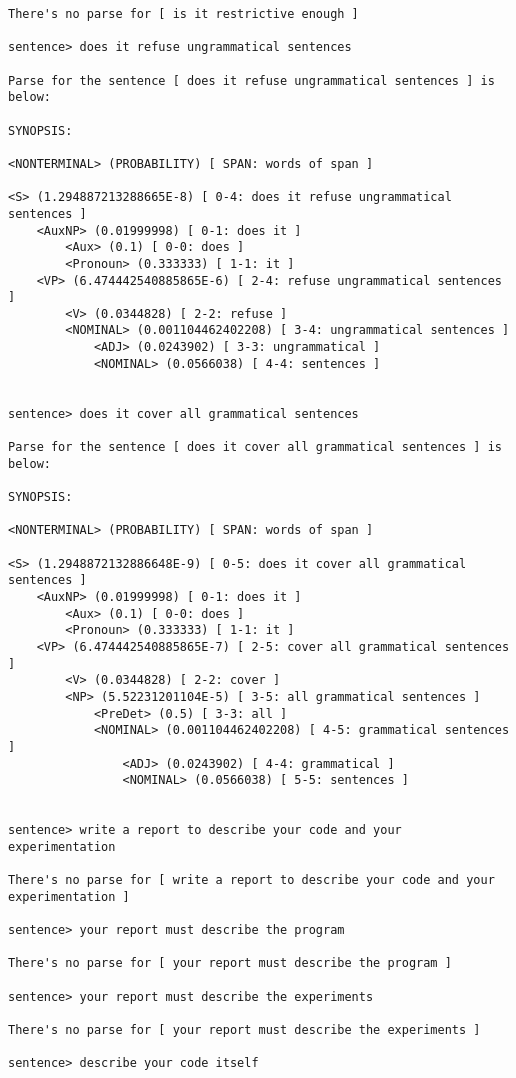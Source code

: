 \begin{verbatim}
There's no parse for [ is it restrictive enough ]

sentence> does it refuse ungrammatical sentences

Parse for the sentence [ does it refuse ungrammatical sentences ] is below:

SYNOPSIS:

<NONTERMINAL> (PROBABILITY) [ SPAN: words of span ]

<S> (1.294887213288665E-8) [ 0-4: does it refuse ungrammatical sentences ]
    <AuxNP> (0.01999998) [ 0-1: does it ]
        <Aux> (0.1) [ 0-0: does ]
        <Pronoun> (0.333333) [ 1-1: it ]
    <VP> (6.474442540885865E-6) [ 2-4: refuse ungrammatical sentences ]
        <V> (0.0344828) [ 2-2: refuse ]
        <NOMINAL> (0.001104462402208) [ 3-4: ungrammatical sentences ]
            <ADJ> (0.0243902) [ 3-3: ungrammatical ]
            <NOMINAL> (0.0566038) [ 4-4: sentences ]


sentence> does it cover all grammatical sentences

Parse for the sentence [ does it cover all grammatical sentences ] is below:

SYNOPSIS:

<NONTERMINAL> (PROBABILITY) [ SPAN: words of span ]

<S> (1.2948872132886648E-9) [ 0-5: does it cover all grammatical sentences ]
    <AuxNP> (0.01999998) [ 0-1: does it ]
        <Aux> (0.1) [ 0-0: does ]
        <Pronoun> (0.333333) [ 1-1: it ]
    <VP> (6.474442540885865E-7) [ 2-5: cover all grammatical sentences ]
        <V> (0.0344828) [ 2-2: cover ]
        <NP> (5.52231201104E-5) [ 3-5: all grammatical sentences ]
            <PreDet> (0.5) [ 3-3: all ]
            <NOMINAL> (0.001104462402208) [ 4-5: grammatical sentences ]
                <ADJ> (0.0243902) [ 4-4: grammatical ]
                <NOMINAL> (0.0566038) [ 5-5: sentences ]


sentence> write a report to describe your code and your experimentation

There's no parse for [ write a report to describe your code and your experimentation ]

sentence> your report must describe the program

There's no parse for [ your report must describe the program ]

sentence> your report must describe the experiments

There's no parse for [ your report must describe the experiments ]

sentence> describe your code itself


\end{verbatim}

